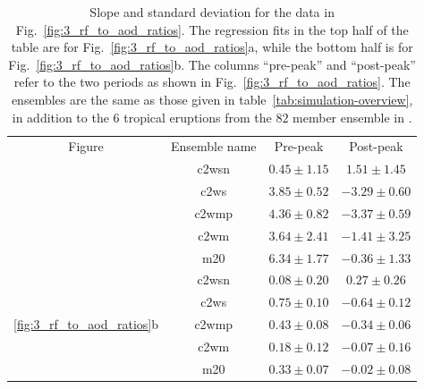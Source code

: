 \documentclass{ametsocV6.1}
\begin{document}
\begin{table}
  \centering

  \caption{Slope and standard deviation for the data in Fig.~\ref{fig:3_rf_to_aod_ratios}.
    The regression fits in the top half of the table are for
    Fig.~\ref{fig:3_rf_to_aod_ratios}a, while the bottom half is for
    Fig.~\ref{fig:3_rf_to_aod_ratios}b. The columns ``pre-peak'' and ``post-peak'' refer to
    the two periods as shown in Fig.~\ref{fig:3_rf_to_aod_ratios}. The ensembles are the
    same as those given in table~\ref{tab:simulation-overview}, in addition to the \(6\)
    tropical eruptions from the \(82\) member ensemble in
    \citet{marshall2020}.}\label{tab:slope-gradients}%
  \begin{tabular}{cccc}
    Figure                                          & Ensemble name & Pre-peak        & Post-peak        \\
    \rowcolor{LightGray}                            & \gls{c2wsn}   & \(0.45\pm1.15\) & \(1.51\pm1.45\)  \\
    \rowcolor{LightGray}                            & \gls{c2ws}    & \(3.85\pm0.52\) & \(-3.29\pm0.60\) \\
    \rowcolor{LightGray}                            & \gls{c2wmp}   & \(4.36\pm0.82\) & \(-3.37\pm0.59\) \\
    \rowcolor{LightGray}                            & \gls{c2wm}    & \(3.64\pm2.41\) & \(-1.41\pm3.25\) \\
    \rowcolor{LightGray}                            & \gls{m20}     & \(6.34\pm1.77\) & \(-0.36\pm1.33\) \\
    \multirow{5}{*}{\ref{fig:3_rf_to_aod_ratios}b}  & \gls{c2wsn}   & \(0.08\pm0.20\) & \(0.27\pm0.26\)  \\
    \multirow{-9}{*}{\ref{fig:3_rf_to_aod_ratios}a} & \gls{c2ws}    & \(0.75\pm0.10\) & \(-0.64\pm0.12\) \\
                                                    & \gls{c2wmp}   & \(0.43\pm0.08\) & \(-0.34\pm0.06\) \\
                                                    & \gls{c2wm}    & \(0.18\pm0.12\) & \(-0.07\pm0.16\) \\
                                                    & \gls{m20}     & \(0.33\pm0.07\) & \(-0.02\pm0.08\) \\
  \end{tabular}
\end{table}
\end{document}
